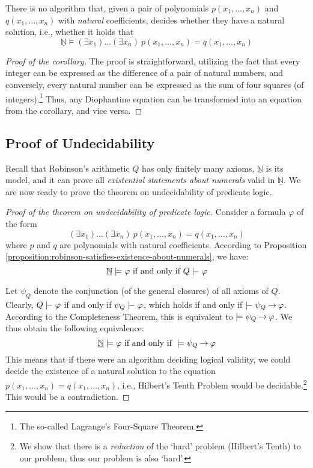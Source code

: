     \begin{corollary}
    There is no algorithm that, given a pair of polynomials $p(x_1,\dots,x_n)$ and $q(x_1,\dots,x_n)$ with \emph{natural} coefficients, decides whether they have a natural solution, i.e., whether it holds that
    $$
    \underline{\mathbb N}\models(\exists x_1)\dots(\exists x_n)\ p(x_1,\dots,x_n)=q(x_1,\dots,x_n)
    $$
    \end{corollary}
    \begin{proof}[Proof of the corollary]
    The proof is straightforward, utilizing the fact that every integer can be expressed as the difference of a pair of natural numbers, and conversely, every natural number can be expressed as the sum of four squares (of integers).\footnote{The so-called Lagrange's Four-Square Theorem.} Thus, any Diophantine equation can be transformed into an equation from the corollary, and vice versa.
    \end{proof}
    
    \subsection{Proof of Undecidability}
    
    Recall that Robinson's arithmetic $Q$ has only finitely many axioms, $\underline{\mathbb N}$ is its model, and it can prove all \emph{existential statements about numerals} valid in $\underline{\mathbb N}$. We are now ready to prove the theorem on undecidability of predicate logic.
    
    \begin{proof}[Proof of the theorem on undecidability of predicate logic]
    Consider a formula $\varphi$ of the form 
    $$(\exists x_1)\dots(\exists x_n)\ p(x_1,\dots,x_n)=q(x_1,\dots,x_n)
    $$ 
    where $p$ and $q$ are polynomials with natural coefficients. According to Proposition \ref{proposition:robinson-satisfies-existence-about-numerals}, we have:
    $$
    \underline{\mathbb N}\models \varphi\text{ if and only if }Q\proves \varphi
    $$
    
    Let $\psi_Q$ denote the conjunction (of the general closures) of all axioms of $Q$. Clearly, $Q\proves\varphi$ if and only if $\psi_Q\proves\varphi$, which holds if and only if $\proves\psi_Q\limplies\varphi$. According to the Completeness Theorem, this is equivalent to $\models\psi_Q\mathbin{\rightarrow}\varphi$. We thus obtain the following equivalence:
    $$
    \underline{\mathbb N}\models \varphi\text{ if and only if }\models \psi_Q\mathbin{\rightarrow}\varphi
    $$
    This means that if there were an algorithm deciding logical validity, we could decide the existence of a natural solution to the equation $p(x_1,\dots,x_n)=q(x_1,\dots,x_n)$, i.e., Hilbert's Tenth Problem would be decidable.\footnote{We show that there is a \emph{reduction} of the `hard' problem (Hilbert's Tenth) to our problem, thus our problem is also `hard'.} This would be a contradiction.
    \end{proof}
    
